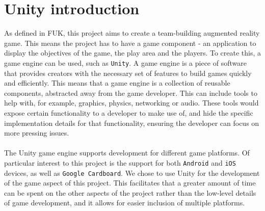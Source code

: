 \section{Unity introduction}
As defined in FUK, this project aims to create a team-building augmented reality game.
This means the project has to have a game component - an application to display the objectives of the game, the play area and the players.
To create this, a game engine can be used, such as \texttt{Unity}.
A game engine is a piece of software that provides creators with the necessary set of features to build games quickly and efficiently\cite{gameengine}.
This means that a game engine is a collection of reusable components, abstracted away from the game developer.
This can include tools to help with, for example, graphics, physics, networking or audio.
These tools would expose certain functionality to a developer to make use of, and hide the specific implementation details for that functionality, ensuring the developer can focus on more pressing issues.
\\\\
The Unity game engine supports development for different game platforms.
Of particular interest to this project is the support for both \texttt{Android} and \texttt{iOS} devices, as well as \texttt{Google Cardboard}\cite{unityplatforms}.
We chose to use Unity for the development of the game aspect of this project.
This facilitates that a greater amount of time can be spent on the other aspects of the project rather than the low-level details of game development, and it allows for easier inclusion of multiple platforms.


